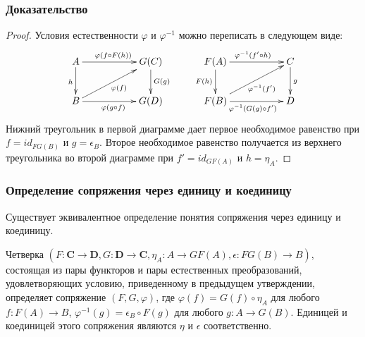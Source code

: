 \documentclass{beamer}
\theoremstyle{definition}
\newcommand{\cat}[1]{\mathbf{#1}}
\renewcommand{\C}{\cat{C}}
\newcommand{\D}{\cat{D}}
\begin{document}
\begin{frame}
\frametitle{Доказательство}
\begin{proof}
Условия естественности $\varphi$ и $\varphi^{-1}$ можно переписать в следующем виде:
\[ \xymatrix{ A \ar[rr]^{\varphi(f \circ F(h))} \ar[d]_h           & & G(C) \ar[d]^{G(g)} \\
              B \ar[rr]_{\varphi(g \circ f)} \ar[urr]_{\varphi(f)} & & G(D)
            }
\qquad
   \xymatrix{ F(A) \ar[rr]^{\varphi^{-1}(f' \circ h)} \ar[d]_{F(h)}                  & & C \ar[d]^g \\
              F(B) \ar[rr]_{\varphi^{-1}(G(g) \circ f')} \ar[urr]_{\varphi^{-1}(f')} & & D
            } \]
Нижний треугольник в первой диаграмме дает первое необходимое равенство при $f = id_{FG(B)}$ и $g = \epsilon_B$.
Второе необходимое равенство получается из верхнего треугольника во второй диаграмме при $f' = id_{GF(A)}$ и $h = \eta_A$.
\end{proof}
\end{frame}

\begin{frame}
\frametitle{Определение сопряжения через единицу и коединицу}
Существует эквивалентное определение понятия сопряжения через единицу и коединицу.
\begin{prop}
Четверка $(F : \C \to \D, G : \D \to \C, \eta_A : A \to GF(A), \epsilon : FG(B) \to B)$, состоящая из пары функторов и пары естественных преобразований,
удовлетворяющих условию, приведенному в предыдущем утверждении, определяет сопряжение $(F,G,\varphi)$, где $\varphi(f) = G(f) \circ \eta_A$ для любого $f : F(A) \to B$,
$\varphi^{-1}(g) = \epsilon_B \circ F(g)$ для любого $g : A \to G(B)$.
Единицей и коединицей этого сопряжения являются $\eta$ и $\epsilon$ соответственно.
\end{prop}
\end{frame}
\end{document}
